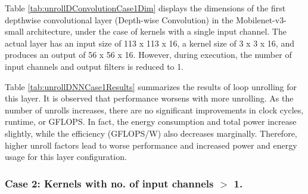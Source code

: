 Table \ref{tab:unrollDConvolutionCase1Dim} displays the dimensions of the first depthwise convolutional layer (Depth-wise Convolution) in the Mobilenet-v3-small architecture, under the case of kernels with a single input channel. The actual layer has an input size of 113 x 113 x 16, a kernel size of 3 x 3 x 16, and produces an output of 56 x 56 x 16. However, during execution, the number of input channels and output filters is reduced to 1.


\begin{table}[H]
\centering
\caption{Loop unrolling results}
\label{tab:unrollDNNCase1Results}
\end{table}

Table \ref{tab:unrollDNNCase1Results} summarizes the results of loop unrolling for this layer. It is observed that performance worsens with more unrolling. As the number of unrolls increases, there are no significant improvements in clock cycles, runtime, or GFLOPS. In fact, the energy consumption and total power increase slightly, while the efficiency (GFLOPS/W) also decreases marginally. Therefore, higher unroll factors lead to worse performance and increased power and energy usage for this layer configuration.

\subsubsection{Case 2: Kernels with no. of input channels $>$ 1.}

